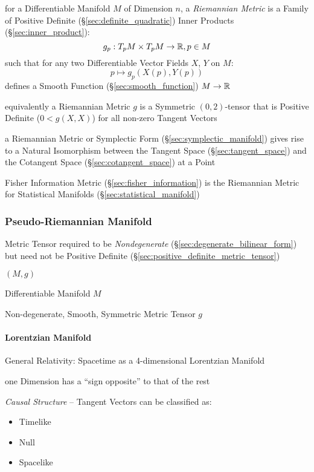 for a Differentiable Manifold $M$ of Dimension $n$, a \emph{Riemannian
  Metric} is a Family of Positive Definite
(\S\ref{sec:definite_quadratic}) Inner Products
(\S\ref{sec:inner_product}):
\[
  g_p : T_p M \times T_p M \rightarrow \mathbb{R}, p \in M
\]
such that for any two Differentiable Vector Fields $X$, $Y$ on $M$:
\[
  p \mapsto g_p (X(p), Y(p))
\]
defines a Smooth Function (\S\ref{sec:smooth_function}) $M \rightarrow
\mathbb{R}$

equivalently a Riemannian Metric $g$ is a Symmetric $(0,2)$-tensor
that is Positive Definite ($0 < g(X,X)$) for all non-zero Tangent
Vectors %

a Riemannian Metric or Symplectic Form (\S\ref{sec:symplectic_manifold}) gives
rise to a Natural Isomorphism between the Tangent Space
(\S\ref{sec:tangent_space}) and the Cotangent Space
(\S\ref{sec:cotangent_space}) at a Point

\fist Fisher Information Metric (\S\ref{sec:fisher_information}) is
the Riemannian Metric for Statistical Manifolds
(\S\ref{sec:statistical_manifold})



\subsubsection{Pseudo-Riemannian Manifold}
\label{sec:pseudo_riemannian}

Metric Tensor required to be \emph{Nondegenerate}
(\S\ref{sec:degenerate_bilinear_form}) but need not be Positive
Definite (\S\ref{sec:positive_definite_metric_tensor})

$(M,g)$

Differentiable Manifold $M$

Non-degenerate, Smooth, Symmetric Metric Tensor $g$



\paragraph{Lorentzian Manifold}\label{sec:lorentzian_manifold}\hfill

General Relativity: Spacetime as a 4-dimensional Lorentzian Manifold

one Dimension has a ``sign opposite'' to that of the rest

\emph{Causal Structure} -- Tangent Vectors can be classified as:
\begin{itemize}
  \item Timelike
  \item Null
  \item Spacelike
\end{itemize}

